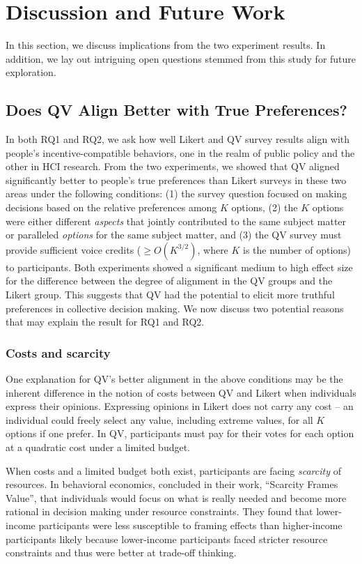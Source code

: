 \section{Discussion and Future Work} \label{discussion}
In this section, we discuss implications from the two experiment results. In addition, we lay out intriguing open questions stemmed from this study for future exploration.

\subsection{Does QV Align Better with True Preferences?}
In both RQ1 and RQ2, we ask how well Likert and QV survey results align with people's incentive-compatible behaviors, one in the realm of public policy and the other in HCI research. From the two experiments, we showed that QV aligned significantly better to people's true preferences than Likert surveys in these two areas under the following conditions: (1) the survey question focused on making decisions based on the relative preferences among $K$ options, (2) the $K$ options were either different \textit{aspects} that jointly contributed to the same subject matter or paralleled \textit{options} for the same subject matter, and (3) the QV survey must provide sufficient voice credits ($\geq O(K^{3/2})$, where $K$ is the number of options) to participants. Both experiments showed a significant medium to high effect size for the difference between the degree of alignment in the QV groups and the Likert group. This suggests that QV had the potential to elicit more truthful preferences in collective decision making. We now discuss two potential reasons that may explain the result for RQ1 and RQ2.

\subsubsection{Costs and scarcity}
One explanation for QV's better alignment in the above conditions may be the inherent difference in the notion of costs between QV and Likert when individuals express their opinions. Expressing opinions in Likert does not carry any cost -- an individual could freely select any value, including extreme values, for all $K$ options if one prefer. In QV, participants must pay for their votes for each option at a quadratic cost under a limited budget. 

When costs and a limited budget both exist, participants are facing \textit{scarcity} of resources. In behavioral economics, \textcite{Shah2015a} concluded in their work, ``Scarcity Frames Value'', that individuals would focus on what is really needed and become more rational in decision making under resource constraints. They found that lower-income participants were less susceptible to framing effects than higher-income participants likely because lower-income participants faced stricter resource constraints and thus were better at trade-off thinking. 

